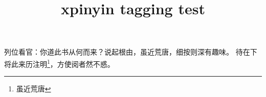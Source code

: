 \documentclass{article}
\title{xpinyin tagging test}
\begin{document}

\begin{pinyinscope}
列位看官：你道此书从何而来？说起根由，虽近荒唐，细按则深有趣味。
待在下将此来历注明\footnote{虽近荒唐}，方使阅者然不惑。
\end{pinyinscope}




\end{document}
